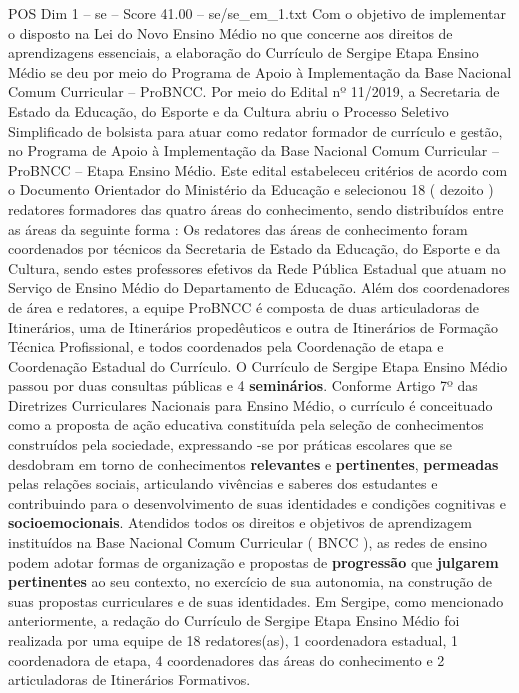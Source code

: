 \begin{textsample}{POS Dim 1 – se – Score 41.00 – se/se\_em\_1.txt}
Com o objetivo de implementar o disposto na Lei do Novo Ensino Médio no que concerne aos direitos de aprendizagens essenciais, a elaboração do Currículo de Sergipe Etapa Ensino Médio se deu por meio do Programa de Apoio à Implementação da Base Nacional Comum Curricular – ProBNCC.
Por meio do Edital nº 11/2019, a Secretaria de Estado da Educação, do Esporte e da Cultura abriu o Processo Seletivo Simplificado de bolsista para atuar como redator formador de currículo e gestão, no Programa de Apoio à Implementação da Base Nacional Comum Curricular – ProBNCC – Etapa Ensino Médio.
Este edital estabeleceu critérios de acordo com o Documento Orientador do Ministério da Educação e selecionou 18 ( dezoito ) redatores formadores das quatro áreas do conhecimento, sendo distribuídos entre as áreas da seguinte forma : Os redatores das áreas de conhecimento foram coordenados por técnicos da Secretaria de Estado da Educação, do Esporte e da Cultura, sendo estes professores efetivos da Rede Pública Estadual que atuam no Serviço de Ensino Médio do Departamento de Educação.
Além dos coordenadores de área e redatores, a equipe ProBNCC é composta de duas articuladoras de Itinerários, uma de Itinerários propedêuticos e outra de Itinerários de Formação Técnica Profissional, e todos coordenados pela Coordenação de etapa e Coordenação Estadual do Currículo.
O Currículo de Sergipe Etapa Ensino Médio passou por duas consultas públicas e 4 \textbf{seminários}.
Conforme Artigo 7º das Diretrizes Curriculares Nacionais para Ensino Médio, o currículo é conceituado como a proposta de ação educativa constituída pela seleção de conhecimentos construídos pela sociedade, expressando -se por práticas escolares que se desdobram em torno de conhecimentos \textbf{relevantes} e \textbf{pertinentes}, \textbf{permeadas} pelas relações sociais, articulando vivências e saberes dos estudantes e contribuindo para o desenvolvimento de suas identidades e condições cognitivas e \textbf{socioemocionais}.
Atendidos todos os direitos e objetivos de aprendizagem instituídos na Base Nacional Comum Curricular ( BNCC ), as redes de ensino podem adotar formas de organização e propostas de \textbf{progressão} que \textbf{julgarem} \textbf{pertinentes} ao seu contexto, no exercício de sua autonomia, na construção de suas propostas curriculares e de suas identidades.
Em Sergipe, como mencionado anteriormente, a redação do Currículo de Sergipe Etapa Ensino Médio foi realizada por uma equipe de 18 redatores(as), 1 coordenadora estadual, 1 coordenadora de etapa, 4 coordenadores das áreas do conhecimento e 2 articuladoras de Itinerários Formativos.

\end{textsample}
